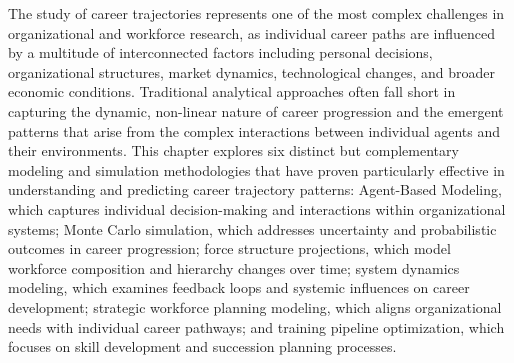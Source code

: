 \documentclass[./main.tex]{subfiles}
\begin{document}
The study of career trajectories represents one of the most complex challenges in organizational and workforce research, as individual career paths are influenced by a multitude of interconnected factors including personal decisions, organizational structures, market dynamics, technological changes, and broader economic conditions. Traditional analytical approaches often fall short in capturing the dynamic, non-linear nature of career progression and the emergent patterns that arise from the complex interactions between individual agents and their environments. This chapter explores six distinct but complementary modeling and simulation methodologies that have proven particularly effective in understanding and predicting career trajectory patterns: Agent-Based Modeling, which captures individual decision-making and interactions within organizational systems; Monte Carlo simulation, which addresses uncertainty and probabilistic outcomes in career progression; force structure projections, which model workforce composition and hierarchy changes over time; system dynamics modeling, which examines feedback loops and systemic influences on career development; strategic workforce planning modeling, which aligns organizational needs with individual career pathways; and training pipeline optimization, which focuses on skill development and succession planning processes.
\end{document}
